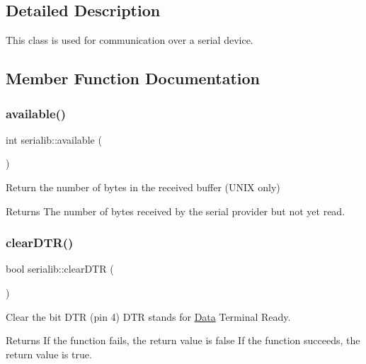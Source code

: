 \subsection{Detailed Description}
This class is used for communication over a serial device. 

\subsection{Member Function Documentation}
\mbox{\label{classserialib_a50c91bf8cab23afdfdf05ca58392456f}} 
\subsubsection{\texorpdfstring{available()}{available()}}
{\footnotesize\ttfamily int serialib\+::available (\begin{DoxyParamCaption}{ }\end{DoxyParamCaption})}



Return the number of bytes in the received buffer (U\+N\+IX only) 

\begin{DoxyReturn}{Returns}
The number of bytes received by the serial provider but not yet read. 
\end{DoxyReturn}
\mbox{\label{classserialib_adf49bff6401d3101b41fb52e98309635}} 
\subsubsection{\texorpdfstring{clear\+D\+T\+R()}{clearDTR()}}
{\footnotesize\ttfamily bool serialib\+::clear\+D\+TR (\begin{DoxyParamCaption}{ }\end{DoxyParamCaption})}



Clear the bit D\+TR (pin 4) D\+TR stands for \hyperlink{classData}{Data} Terminal Ready. 

\begin{DoxyReturn}{Returns}
If the function fails, the return value is false If the function succeeds, the return value is true. 
\end{DoxyReturn}
\mbox{\label{classserialib_ab0b5882339240002fccf7701f5321e0a}} 
